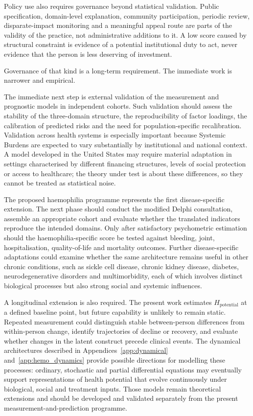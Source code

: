 Policy use also requires governance beyond statistical validation. Public
specification, domain-level explanation, community participation, periodic
review, disparate-impact monitoring and a meaningful appeal route are parts of
the validity of the practice, not administrative additions to it. A low score
caused by structural constraint is evidence of a potential institutional duty
to act, never evidence that the person is less deserving of investment.

Governance of that kind is a long-term requirement. The immediate work is
narrower and empirical.

\noindent The immediate next step is external validation of the measurement and prognostic models in independent cohorts. Such validation should assess the stability of the three-domain structure, the reproducibility of factor loadings, the calibration of predicted risks and the need for population-specific recalibration. Validation across health systems is especially important because Systemic Burdens are expected to vary substantially by institutional and national context. A model developed in the United States may require material adaptation in settings characterised by different financing structures, levels of social protection or access to healthcare; the theory under test is about these differences, so they cannot be treated as statistical noise.

The proposed haemophilia programme represents the first disease-specific extension. The next phase should conduct the modified Delphi consultation, assemble an appropriate cohort and evaluate whether the translated indicators reproduce the intended domains. Only after satisfactory psychometric estimation should the haemophilia-specific score be tested against bleeding, joint, hospitalisation, quality-of-life and mortality outcomes. Further disease-specific adaptations could examine whether the same architecture remains useful in other chronic conditions, such as sickle cell disease, chronic kidney disease, diabetes, neurodegenerative disorders and multimorbidity, each of which involves distinct biological processes but also strong social and systemic influences.

A longitudinal extension is also required. The present work estimates $H_{\text{potential}}$ at a defined baseline point, but future capability is unlikely to remain static. Repeated measurement could distinguish stable between-person differences from within-person change, identify trajectories of decline or recovery, and evaluate whether changes in the latent construct precede clinical events. The dynamical architectures described in Appendices~\ref{app:dynamical} and~\ref{app:hemo_dynamics} provide possible directions for modelling these processes: ordinary, stochastic and partial differential equations may eventually support representations of health potential that evolve continuously under biological, social and treatment inputs. Those models remain theoretical extensions and should be developed and validated separately from the present measurement-and-prediction programme.


